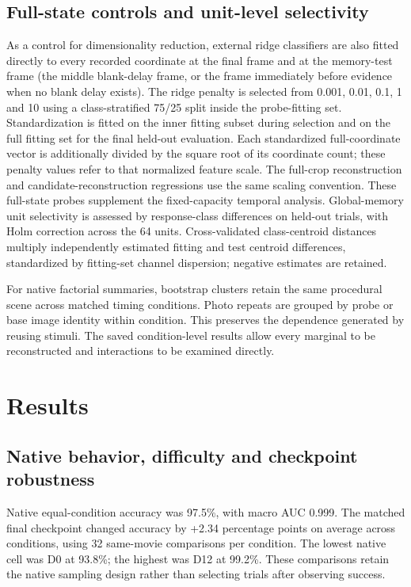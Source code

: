 \documentclass[11pt]{article}
\begin{document}
\subsection{Full-state controls and unit-level selectivity}
As a control for dimensionality reduction, external ridge classifiers are also fitted directly to every recorded coordinate at the final frame and at the memory-test frame (the middle blank-delay frame, or the frame immediately before evidence when no blank delay exists). The ridge penalty is selected from 0.001, 0.01, 0.1, 1 and 10 using a class-stratified 75/25 split inside the probe-fitting set. Standardization is fitted on the inner fitting subset during selection and on the full fitting set for the final held-out evaluation. Each standardized full-coordinate vector is additionally divided by the square root of its coordinate count; these penalty values refer to that normalized feature scale. The full-crop reconstruction and candidate-reconstruction regressions use the same scaling convention. These full-state probes supplement the fixed-capacity temporal analysis. Global-memory unit selectivity is assessed by response-class differences on held-out trials, with Holm correction across the 64 units. Cross-validated class-centroid distances multiply independently estimated fitting and test centroid differences, standardized by fitting-set channel dispersion; negative estimates are retained.

For native factorial summaries, bootstrap clusters retain the same procedural scene across matched timing conditions. Photo repeats are grouped by probe or base image identity within condition. This preserves the dependence generated by reusing stimuli. The saved condition-level results allow every marginal to be reconstructed and interactions to be examined directly.
\section{Results}
\subsection{Native behavior, difficulty and checkpoint robustness}
Native equal-condition accuracy was 97.5\%, with macro AUC 0.999. The matched final checkpoint changed accuracy by +2.34 percentage points on average across conditions, using 32 same-movie comparisons per condition. The lowest native cell was D0 at 93.8\%; the highest was D12 at 99.2\%. These comparisons retain the native sampling design rather than selecting trials after observing success.
\end{document}
